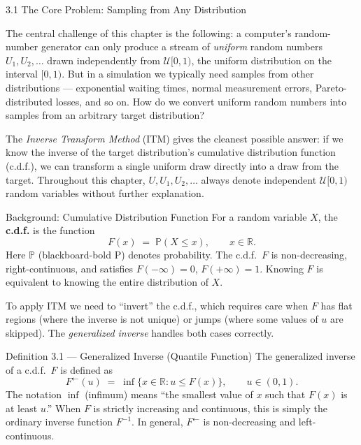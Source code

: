 \documentclass[aspectratio=169,10pt]{beamer}
\newcommand{\PP}{\mathbb{P}}
\newcommand{\RR}{\mathbb{R}}
\newcommand{\UU}{\mathcal{U}}
\newcommand{\FInv}{F^{\leftarrow}}
\begin{document}
\begin{frame}[allowframebreaks]{3.1 The Core Problem: Sampling from Any Distribution}

The central challenge of this chapter is the following: a computer's random-number
generator can only produce a stream of \emph{uniform} random numbers
$U_1, U_2, \ldots$ drawn independently from $\UU[0,1)$, the uniform distribution
on the interval $[0, 1)$.  But in a simulation we typically need samples from
other distributions --- exponential waiting times, normal measurement errors,
Pareto-distributed losses, and so on.  How do we convert uniform random numbers
into samples from an arbitrary target distribution?

The \emph{Inverse Transform Method} (ITM) gives the cleanest possible answer:
if we know the inverse of the target distribution's cumulative distribution function
(c.d.f.), we can transform a single uniform draw directly into a draw from the
target.  Throughout this chapter, $U, U_1, U_2, \ldots$ always denote independent
$\UU[0,1)$ random variables without further explanation.

\begin{block}{Background: Cumulative Distribution Function}
  For a random variable $X$, the \textbf{c.d.f.} is the function
  \[
    F(x) \;=\; \PP(X \le x), \qquad x \in \RR.
  \]
  Here $\PP$ (blackboard-bold P) denotes probability.  The c.d.f.\ $F$ is
  non-decreasing, right-continuous, and satisfies $F(-\infty) = 0$, $F(+\infty) = 1$.
  Knowing $F$ is equivalent to knowing the entire distribution of $X$.
\end{block}

\framebreak

To apply ITM we need to ``invert'' the c.d.f., which requires care when $F$ has flat
regions (where the inverse is not unique) or jumps (where some values of $u$ are
skipped).  The \emph{generalized inverse} handles both cases correctly.

\begin{block}{Definition 3.1 --- Generalized Inverse (Quantile Function)}
  The generalized inverse of a c.d.f.\ $F$ is defined as
  \[
    \FInv(u) \;=\; \inf\!\bigl\{x \in \RR : u \le F(x)\bigr\}, \qquad u \in (0,1).
  \]
  The notation $\inf$ (infimum) means ``the smallest value of $x$ such that
  $F(x)$ is at least $u$.''  When $F$ is strictly increasing and continuous,
  this is simply the ordinary inverse function $F^{-1}$.  In general, $\FInv$
  is non-decreasing and left-continuous.
\end{block}


\end{frame}
\end{document}
